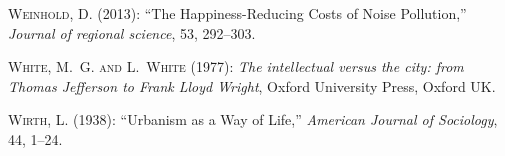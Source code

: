\documentclass[12pt, letterpaper]{article}
\begin{document}
\begin{spacing}{1.9}
\begin{thebibliography}{77}
\textsc{Weinhold, D.} (2013): \enquote{The Happiness-Reducing Costs of Noise
  Pollution,} \emph{Journal of regional science}, 53, 292--303.

\textsc{White, M.~G. and L.~White} (1977): \emph{The intellectual versus the
  city: from Thomas Jefferson to Frank Lloyd Wright}, Oxford University Press,
  Oxford UK.

\textsc{Wirth, L.} (1938): \enquote{Urbanism as a Way of Life,} \emph{American
  Journal of Sociology}, 44, 1--24.

\end{thebibliography}


\end{spacing}
\end{document}
